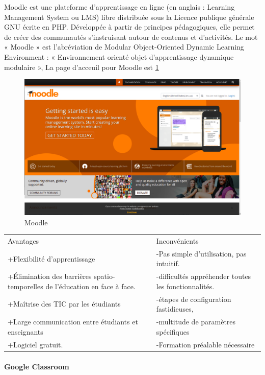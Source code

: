 \documentclass[12pt]{report}
\begin{document}
Moodle est une plateforme d'apprentissage en ligne (en anglais : Learning Management System ou LMS) libre distribuée sous la Licence publique générale GNU écrite en PHP. Développée à partir de principes pédagogiques, elle permet de créer des communautés s'instruisant autour de contenus et d'activités. Le mot « Moodle » est l'abréviation de Modular Object-Oriented Dynamic Learning Environment : « Environnement orienté objet d'apprentissage dynamique modulaire », La page d'acceuil pour Moodle est \ref{fig:moodle}
\begin{figure}[h]
    \centering
    \includegraphics[width=.8\textwidth]{moodle}
    \caption{Moodle}
    \label{fig:moodle}
\end{figure}

\begin{table}[h!]
\begin{center}
\begin{tabular}{ p{8cm}  p{8cm}  }
Avantages & Inconvénients \\
+Flexibilité d'apprentissage & -Pas simple d’utilisation, pas intuitif. \\ 
+Élimination des barrières spatio-temporelles de l'éducation en face à face. & -difficultés appréhender toutes les fonctionnalités. \\
+Maîtrise des TIC par les étudiants& -étapes de configuration fastidieuses, \\
+Large communication entre étudiants et enseignants & -multitude de paramètres spécifiques\\
+Logiciel gratuit. &  -Formation préalable nécessaire 
\end{tabular}
\end{center}
\end{table}
\newpage
\paragraph{Google Classroom}
\end{document}
